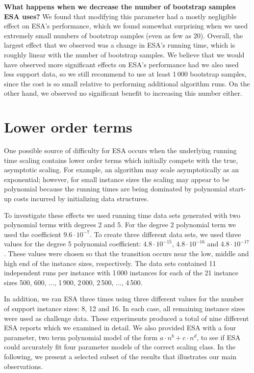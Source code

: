 \documentclass[aic]{iosart2x}
\begin{document}
\textbf{What happens when we decrease the number of bootstrap samples ESA uses?}
We found that modifying this parameter had a mostly negligible effect on ESA's performance, which we found somewhat surprising when we used extremely small numbers of bootstrap samples (even as few as 20). Overall, the largest effect that we observed was a change in ESA's running time, which is roughly linear with the number of bootstrap samples. We believe that we would have observed more significant effects on ESA's performance had we also used less support data, so we still recommend to use at least 1\,000 bootstrap samples, since the cost is so small relative to performing additional algorithm runs. On the other hand, we observed no significant benefit to increasing this number either. 


\section{Lower order terms}
\label{sec:Lower Order Terms}

One possible source of difficulty for ESA occurs when the underlying running time scaling contains lower order terms which initially compete with the true, asymptotic scaling. For example, an algorithm may scale asymptotically as an exponential; however, for small instance sizes the scaling may appear to be polynomial because the running times are being dominated by polynomial start-up costs incurred by initializing data structures. 

To investigate these effects we used running time data sets generated with two polynomial terms with degrees 2 and 5. For the degree 2 polynomial term we used the coefficient $9.6\cdot 10^{-7}$. To create three different data sets, we used three values for the degree 5 polynomial coefficient: $4.8\cdot 10^{-15}$, $4.8\cdot 10^{-16}$ and $4.8 \cdot 10^{-17}$. These values were chosen so that the transition occurs near the low, middle and high end of the instance sizes, respectively. The data sets contained 11 independent runs per instance with 1\,000 instances for each of the 21 instance sizes 500, 600, ..., 1\,900, 2\,000, 2\,500, ..., 4\,500. 

In addition, we ran ESA three times using three different values for the number of support instance sizes: 8, 12 and 16. In each case, all remaining instance sizes were used as challenge data. These experiments produced a total of nine different ESA reports which we examined in detail. 
We also provided ESA with a four parameter, two term polynomial model of the form $a\cdot n^b + c\cdot n^d$, to see if ESA could accurately fit four parameter models of the correct scaling class. 
In the following, we present a selected subset of the results that illustrates our main observations. 
\end{document}

